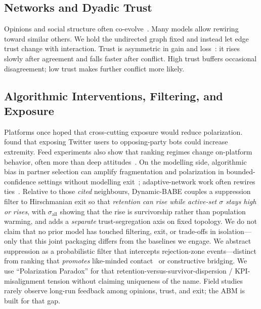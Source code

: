 \subsection{Networks and Dyadic Trust}
Opinions and social structure often co-evolve~\citep{Macy2002, Centola2010, Keijzer2018}. Many models allow rewiring toward similar others. We hold the undirected graph fixed and instead let edge trust change with interaction. Trust is asymmetric in gain and loss~\citep{Slovic1993}: it rises slowly after agreement and falls faster after conflict. High trust buffers occasional disagreement; low trust makes further conflict more likely.

\subsection{Algorithmic Interventions, Filtering, and Exposure}
Platforms once hoped that cross-cutting exposure would reduce polarization. \citet{Bail2018} found that exposing Twitter users to opposing-party bots could increase extremity. Feed experiments also show that ranking regimes change on-platform behavior, often more than deep attitudes~\citep{Levy2021, Guess2023}. On the modelling side, algorithmic bias in partner selection can amplify fragmentation and polarization in bounded-confidence settings without modelling exit~\citep{Sirbu2019}; adaptive-network work often rewires ties~\citep{Macy2002, Keijzer2018}. Relative to those \emph{cited} neighbours, Dynamic-BABE couples a suppression filter to Hirschmanian exit so that \emph{retention can rise while active-set $\sigma$ stays high or rises}, with $\sigma_{\mathrm{all}}$ showing that the rise is survivorship rather than population warming, and adds a \emph{separate} trust-segregation axis on fixed topology. We do not claim that no prior model has touched filtering, exit, or trade-offs in isolation---only that this joint packaging differs from the baselines we engage. We abstract suppression as a probabilistic filter that intercepts rejection-zone events---distinct from ranking that \emph{promotes} like-minded contact~\citep{Sirbu2019} or constructive bridging. We use ``Polarization Paradox'' for that retention-versus-survivor-dispersion / KPI-misalignment tension without claiming uniqueness of the name. Field studies rarely observe long-run feedback among opinions, trust, and exit; the ABM is built for that gap.
